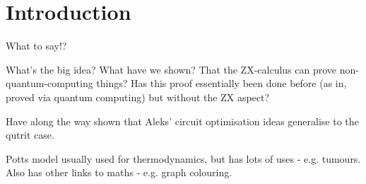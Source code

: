 \section{Introduction}

What to say!?\newline

What's the big idea? What have we shown? That the ZX-calculus can prove non-quantum-computing things? Has this proof essentially been done before (as in, proved via quantum computing) but without the ZX aspect?\newline

Have along the way shown that Aleks' circuit optimisation ideas generalise to the qutrit case.\newline

Potts model usually used for thermodynamics, but has lots of uses - e.g. tumours. Also has other links to maths - e.g. graph colouring.



